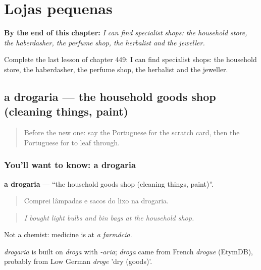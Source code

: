 
\chapter{Lojas pequenas}
\label{ch:pt-lojas-pequenas}

\begin{chapteropening}
\textbf{By the end of this chapter:} \emph{I can find specialist shops: the household store, the haberdasher, the perfume shop, the herbalist and the jeweller.}

Complete the last lesson of chapter 449: I can find specialist shops: the household store, the haberdasher, the perfume shop, the herbalist and the jeweller.
\end{chapteropening}

\section[a drogaria]{a drogaria — the household goods shop (cleaning things, paint)}

\label{lesson:PT-C449-drogaria}



\begin{quote}
Before the new one: say the Portuguese for the scratch card, then the Portuguese for to leaf through.
\end{quote}

\subsection*{You'll want to know: a drogaria}
\textbf{a drogaria} — \textquotedblleft{}the household goods shop (cleaning things, paint)\textquotedblright{}.

\begin{quote}
Comprei lâmpadas e sacos do lixo na drogaria.
\end{quote}

\begin{quote}
\emph{I bought light bulbs and bin bags at the household shop.}
\end{quote}

Not a chemist: medicine is at \emph{a farmácia}.

\begin{cousinweb}
\emph{drogaria} is built on \emph{droga} with \emph{-aria}; \emph{droga} came from French \emph{drogue} (EtymDB), probably from Low German \emph{droge} 'dry (goods)'.
\end{cousinweb}

